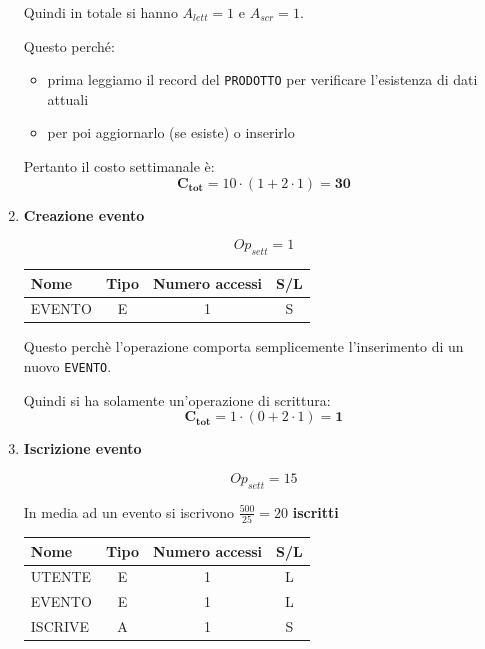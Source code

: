 \documentclass[a4paper,12pt]{report}
\begin{document}
\begin{enumerate}
    Quindi in totale si hanno $A_{lett}=1$ e $A_{scr}=1$.

    Questo perché:
    \begin{itemize}
        \item prima leggiamo il record del \texttt{PRODOTTO} per verificare l'esistenza di dati attuali
        \item per poi aggiornarlo (se esiste) o inserirlo
    \end{itemize}

    Pertanto il costo settimanale è:
    $$\mathbf{C_{tot}} = 10 \cdot (1 + 2 \cdot 1) = \mathbf{30}$$

	\item {\large \textbf{Creazione evento}} \label{op9}

    $$
    {Op}_{sett} = 1
    $$

    \begin{table}[H]
    \centering
    \small
    \renewcommand{\arraystretch}{1.15}
    \begin{tabularx}{0.8\textwidth}{|X|c|c|c|}
        \hline
        \rowcolor{gray!20}
        \textbf{Nome} & \textbf{Tipo} & \textbf{Numero accessi} & \textbf{S/L} \\
        \hline
        EVENTO & E & 1 & S \\
        \hline
    \end{tabularx}
    \end{table}

    Questo perchè l’operazione comporta semplicemente l’inserimento di un nuovo \texttt{EVENTO}.

    Quindi si ha solamente un'operazione di scrittura: 
	$$
    \mathbf{C_{tot}} = 1 \cdot (0 + 2 \cdot 1) = \mathbf{1}
    $$

	\item {\large \textbf{Iscrizione evento}} \label{op10}

    $$
    {Op}_{sett} = 15
    $$

    In media ad un evento si iscrivono $\frac{500}{25}=20$ \textbf{iscritti}
    
    \begin{table}[H]
    \centering
    \small
    \renewcommand{\arraystretch}{1.15}
    \begin{tabularx}{0.9\textwidth}{|X|c|c|c|}
        \hline
        \rowcolor{gray!20}
        \textbf{Nome} & \textbf{Tipo} & \textbf{Numero accessi} & \textbf{S/L} \\
        \hline
        UTENTE & E & 1 & L \\
        EVENTO & E & 1 & L \\
        ISCRIVE & A & 1 & S \\
        \hline
    \end{tabularx}
    \end{table}


\end{enumerate}
\end{document}
